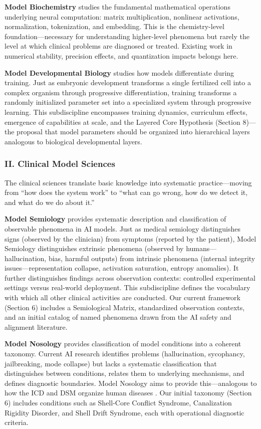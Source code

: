 \documentclass[11pt]{article}
\begin{document}
\textbf{Model Biochemistry} studies the fundamental mathematical operations underlying neural computation: matrix multiplication, nonlinear activations, normalization, tokenization, and embedding. This is the chemistry-level foundation---necessary for understanding higher-level phenomena but rarely the level at which clinical problems are diagnosed or treated. Existing work in numerical stability, precision effects, and quantization impacts belongs here.

\textbf{Model Developmental Biology} studies how models differentiate during training. Just as embryonic development transforms a single fertilized cell into a complex organism through progressive differentiation, training transforms a randomly initialized parameter set into a specialized system through progressive learning. This subdiscipline encompasses training dynamics, curriculum effects, emergence of capabilities at scale, and the Layered Core Hypothesis (Section 8)---the proposal that model parameters should be organized into hierarchical layers analogous to biological developmental layers.

\subsubsection{II. Clinical Model Sciences}

The clinical sciences translate basic knowledge into systematic practice---moving from ``how does the system work'' to ``what can go wrong, how do we detect it, and what do we do about it.''

\textbf{Model Semiology} provides systematic description and classification of observable phenomena in AI models. Just as medical semiology distinguishes signs (observed by the clinician) from symptoms (reported by the patient), Model Semiology distinguishes extrinsic phenomena (observed by humans---hallucination, bias, harmful outputs) from intrinsic phenomena (internal integrity issues---representation collapse, activation saturation, entropy anomalies). It further distinguishes findings across observation contexts: controlled experimental settings versus real-world deployment. This subdiscipline defines the vocabulary with which all other clinical activities are conducted. Our current framework (Section 6) includes a Semiological Matrix, standardized observation contexts, and an initial catalog of named phenomena drawn from the AI safety and alignment literature.

\textbf{Model Nosology} provides classification of model conditions into a coherent taxonomy. Current AI research identifies problems (hallucination, sycophancy, jailbreaking, mode collapse) but lacks a systematic classification that distinguishes between conditions, relates them to underlying mechanisms, and defines diagnostic boundaries. Model Nosology aims to provide this---analogous to how the ICD and DSM organize human diseases \citep{APA2013}. Our initial taxonomy (Section 6) includes conditions such as Shell-Core Conflict Syndrome, Canalization Rigidity Disorder, and Shell Drift Syndrome, each with operational diagnostic criteria.
\end{document}
